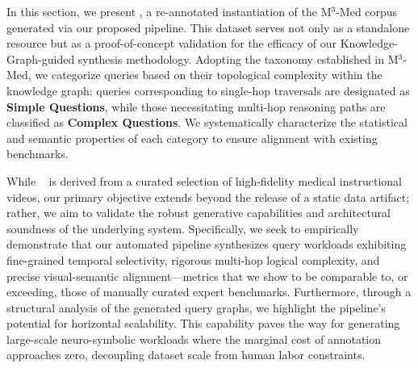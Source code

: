 In this section, we present \textbf{\BenchmarkName}, a re-annotated instantiation of the M$^3$-Med\cite{m3med} corpus generated via our proposed pipeline. 
This dataset serves not only as a standalone resource but as a proof-of-concept validation for the efficacy of our Knowledge-Graph-guided synthesis methodology. 
Adopting the taxonomy established in M$^3$-Med, we categorize queries based on their topological complexity within the knowledge graph: queries corresponding to single-hop traversals are designated as \textbf{Simple Questions}, while those necessitating multi-hop reasoning paths are classified as \textbf{Complex Questions}. 
We systematically characterize the statistical and semantic properties of each category to ensure alignment with existing benchmarks.

While \BenchmarkName~ is derived from a curated selection of high-fidelity medical instructional videos, our primary objective extends beyond the release of a static data artifact; rather, we aim to validate the robust generative capabilities and architectural soundness of the underlying system. 
Specifically, we seek to empirically demonstrate that our automated pipeline synthesizes query workloads exhibiting fine-grained temporal selectivity, rigorous multi-hop logical complexity, and precise visual-semantic alignment—metrics that we show to be comparable to, or exceeding, those of manually curated expert benchmarks. 
Furthermore, through a structural analysis of the generated query graphs, we highlight the pipeline's potential for horizontal scalability. 
This capability paves the way for generating large-scale neuro-symbolic workloads where the marginal cost of annotation approaches zero, decoupling dataset scale from human labor constraints.
